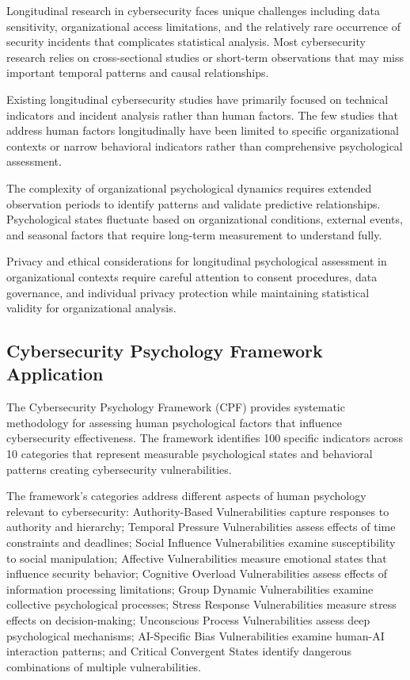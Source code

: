 \documentclass[10pt, twocolumn]{article}
\begin{document}
Longitudinal research in cybersecurity faces unique challenges including data sensitivity, organizational access limitations, and the relatively rare occurrence of security incidents that complicates statistical analysis. Most cybersecurity research relies on cross-sectional studies or short-term observations that may miss important temporal patterns and causal relationships.

Existing longitudinal cybersecurity studies have primarily focused on technical indicators and incident analysis rather than human factors. The few studies that address human factors longitudinally have been limited to specific organizational contexts or narrow behavioral indicators rather than comprehensive psychological assessment.

The complexity of organizational psychological dynamics requires extended observation periods to identify patterns and validate predictive relationships. Psychological states fluctuate based on organizational conditions, external events, and seasonal factors that require long-term measurement to understand fully.

Privacy and ethical considerations for longitudinal psychological assessment in organizational contexts require careful attention to consent procedures, data governance, and individual privacy protection while maintaining statistical validity for organizational analysis\cite{beauchamp2019}.

\subsection{Cybersecurity Psychology Framework Application}

The Cybersecurity Psychology Framework (CPF) provides systematic methodology for assessing human psychological factors that influence cybersecurity effectiveness\cite{canale2024}. The framework identifies 100 specific indicators across 10 categories that represent measurable psychological states and behavioral patterns creating cybersecurity vulnerabilities.

The framework's categories address different aspects of human psychology relevant to cybersecurity: Authority-Based Vulnerabilities capture responses to authority and hierarchy; Temporal Pressure Vulnerabilities assess effects of time constraints and deadlines; Social Influence Vulnerabilities examine susceptibility to social manipulation; Affective Vulnerabilities measure emotional states that influence security behavior; Cognitive Overload Vulnerabilities assess effects of information processing limitations; Group Dynamic Vulnerabilities examine collective psychological processes; Stress Response Vulnerabilities measure stress effects on decision-making; Unconscious Process Vulnerabilities assess deep psychological mechanisms; AI-Specific Bias Vulnerabilities examine human-AI interaction patterns; and Critical Convergent States identify dangerous combinations of multiple vulnerabilities.
\end{document}
